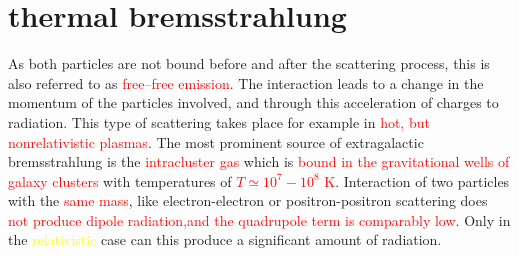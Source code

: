 \documentclass[12pt,a4paper]{article}
\begin{document}
\section{thermal bremsstrahlung}
\cite{2012agn..book.....B} As both particles are not bound before and after the scattering process, this is also referred to as \textcolor{red}{free–free emission}. The interaction leads to a change in the momentum of the particles involved, and through this acceleration of charges to radiation. This type of scattering takes place for example in \textcolor{red}{hot, but nonrelativistic plasmas}. The most prominent source of extragalactic bremsstrahlung is the \textcolor{red}{intracluster gas} which is \textcolor{red}{bound in the gravitational wells of galaxy clusters} with temperatures of \textcolor{red}{$T \simeq 10^7 - 10^8$ K}. Interaction of two particles with the \textcolor{red}{same mass}, like electron-electron or positron-positron scattering does \textcolor{red}{not produce dipole radiation,and the quadrupole term is comparably low}. Only in the \textcolor{yellow}{relativistic} case can this produce a significant amount of radiation.




\end{document}
